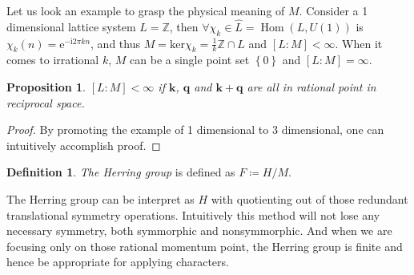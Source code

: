 \documentclass[11pt, reqno]{amsart}
\newtheorem{proposition}[theorem]{Proposition}
\theoremstyle{definition}
\newtheorem{definition}[theorem]{Definition}
\theoremstyle{remark}
\begin{document}

Let us look an example to grasp the physical meaning of $M$. Consider a 1 dimensional lattice system $L=\mathbb{Z}$, then $\forall\chi_k\in\widehat{L}=\operatorname{Hom}\left(L, U\left(1\right)\right)$ is $\chi _k\left( n \right) =\mathrm{e}^{-\mathrm{i}2\pi kn}$, and thus $M=\mathrm{ker}\chi _k=\frac{1}{k}\mathbb{Z} \cap L$ and $\left[ L:M \right] <\infty$. When it comes to irrational $k$, $M$ can be a single point set $\left\{0\right\}$ and $\left[ L:M \right] =\infty$.

\begin{proposition}
    $\left[ L:M \right] <\infty$ if $\mathbf{k}$, $\mathbf{q}$ and $\mathbf{k}+\mathbf{q}$ are all in rational point in reciprocal space.
\end{proposition}
\begin{proof}
    By promoting the example of 1 dimensional to 3 dimensional, one can intuitively accomplish proof.
\end{proof}

\begin{definition}
    \textit{The Herring group} is defined as $F\coloneqq H/M$.
\end{definition}

The Herring group can be interpret as $H$ with quotienting out of those redundant translational symmetry operations. Intuitively this method will not lose any necessary symmetry, both symmorphic and nonsymmorphic. And when we are focusing only on those rational momentum point, the Herring group is finite and hence be appropriate for applying characters.
\end{document}
